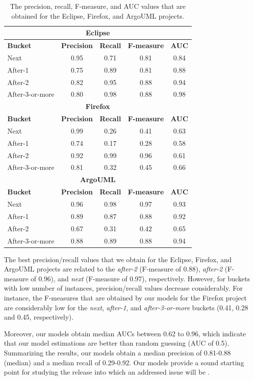 \begin{table}
	\footnotesize
	\centering
	\caption{The precision, recall, F-measure, and AUC values that are
	obtained for the Eclipse, Firefox, and ArgoUML projects. 
	\label{ch4:tbl:evaluation_metrics}
	}
	\begin{tabular}{lcccc}
		\hline
		\multicolumn{5}{c}{\textbf{Eclipse}}\tabularnewline
		\hline 
		\textbf{Bucket} & \textbf{Precision} & \textbf{Recall} &
		\textbf{F-measure} & \textbf{AUC}\tabularnewline
		\hline 
		Next & 0.95  & 0.71  & 0.81 & 0.84 \tabularnewline
		\hline 
		After-1 & 0.75 & 0.89 & 0.81 & 0.88\tabularnewline
		\hline 
		After-2 & 0.82 & 0.95 & 0.88 & 0.94\tabularnewline
		\hline 
		After-3-or-more & 0.80 & 0.98 & 0.88 & 0.98\tabularnewline
		\hline 
		\hline
		\multicolumn{5}{c}{\textbf{Firefox}}\tabularnewline
		\hline 
		\textbf{Bucket} & \textbf{Precision} & \textbf{Recall} &
		\textbf{F-measure} & \textbf{AUC}\tabularnewline
		\hline 
		Next & 0.99  & 0.26  & 0.41 & 0.63 \tabularnewline
		\hline 
		After-1 & 0.74 & 0.17 & 0.28 & 0.58\tabularnewline
		\hline 
		After-2 & 0.92 & 0.99 & 0.96 & 0.61\tabularnewline
		\hline 
		After-3-or-more & 0.81 & 0.32 & 0.45 & 0.66\tabularnewline
		\hline 
		\hline
		\multicolumn{5}{c}{\textbf{ArgoUML}}\tabularnewline
		\hline 
		\textbf{Bucket} & \textbf{Precision} & \textbf{Recall} &
		\textbf{F-measure} & \textbf{AUC}\tabularnewline
		\hline 
		Next & 0.96  & 0.98  & 0.97 & 0.93 \tabularnewline
		\hline 
		After-1 & 0.89 & 0.87 & 0.88 & 0.92\tabularnewline
		\hline 
		After-2 & 0.67 & 0.31 & 0.42 & 0.65\tabularnewline
		\hline 
		After-3-or-more & 0.88 & 0.89 & 0.88 & 0.94\tabularnewline
		\hline 
	\end{tabular}
\end{table}

The best precision/recall values that we obtain for the Eclipse, Firefox, and
ArgoUML projects are related to the \textit{after-2} (F-measure of 0.88),
\textit{after-2} (F-measure of 0.96), and \textit{next} (F-measure of 0.97),
respectively. However, for buckets with low number of instances,
precision/recall values decrease considerably. For instance, the F-measures that
are obtained by our models for the Firefox project are considerably low for the
\textit{next}, \textit{after-1}, and \textit{after-3-or-more} buckets (0.41,
0.28 and 0.45, respectively).

Moreover, our models obtain median AUCs between 0.62 to 0.96, which indicate
that our model estimations are better than random guessing (AUC of 0.5).
Summarizing the results, our models obtain a median precision of 0.81-0.88
(median) and a median recall of 0.29-0.92. Our models provide a sound starting
point for studying the release into which an addressed issue will be \DIFdelbegin {}\DIFdelend \DIFaddbegin {}\DIFaddend .\\

